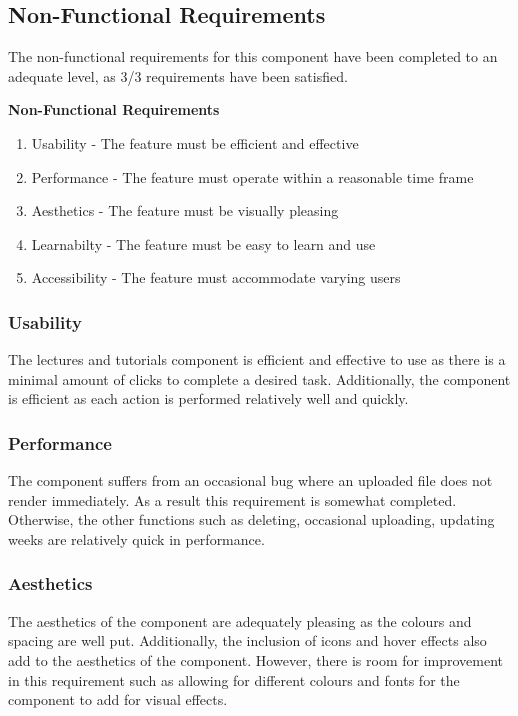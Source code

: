 \subsection{Non-Functional Requirements}
The non-functional requirements for this component have been completed to an adequate level, as 3/3 requirements have been satisfied. 

\textbf{Non-Functional Requirements}
  \begin{enumerate}
    \item Usability - The feature must be efficient and effective
    \item Performance - The feature must operate within a reasonable time frame
    \item Aesthetics - The feature must be visually pleasing
    \item Learnabilty - The feature must be easy to learn and use
    \item Accessibility - The feature must accommodate varying users
\end{enumerate}

\subsubsection{Usability}
The lectures and tutorials component is efficient and effective to use as there is a minimal amount of clicks to complete a desired task. Additionally, the component is efficient as each action is performed relatively well and quickly.

\subsubsection{Performance}
The component suffers from an occasional bug where an uploaded file does not render immediately. As a result this requirement is somewhat completed. Otherwise, the other functions such as deleting, occasional uploading, updating weeks are relatively quick in performance.

\subsubsection{Aesthetics}
The aesthetics of the component are adequately pleasing as the colours and spacing are well put. Additionally, the inclusion of icons and hover effects also add to the aesthetics of the component. However, there is room for improvement in this requirement such as allowing for different colours and fonts for the component to add for visual effects.

